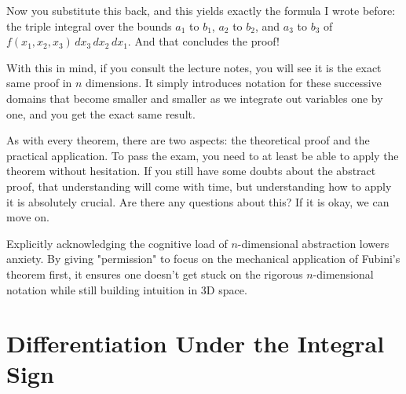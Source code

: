 
\begin{spoken-clean}[30:32 - 32:44]
Now you substitute this back, and this yields exactly the formula I wrote before: the triple integral over the bounds $a_1$ to $b_1$, $a_2$ to $b_2$, and $a_3$ to $b_3$ of $f(x_1, x_2, x_3) \, dx_3 \, dx_2 \, dx_1$. And that concludes the proof! 

With this in mind, if you consult the lecture notes, you will see it is the exact same proof in $n$ dimensions. It simply introduces notation for these successive domains that become smaller and smaller as we integrate out variables one by one, and you get the exact same result.

As with every theorem, there are two aspects: the theoretical proof and the practical application. To pass the exam, you need to at least be able to apply the theorem without hesitation. If you still have some doubts about the abstract proof, that understanding will come with time, but understanding how to apply it is absolutely crucial. Are there any questions about this? If it is okay, we can move on.
\end{spoken-clean}

\begin{didactic-insight}
Explicitly acknowledging the cognitive load of $n$-dimensional abstraction lowers anxiety. By giving "permission" to focus on the mechanical application of Fubini's theorem first, it ensures one doesn't get stuck on the rigorous $n$-dimensional notation while still building intuition in 3D space.
\end{didactic-insight}



\section{Differentiation Under the Integral Sign}

